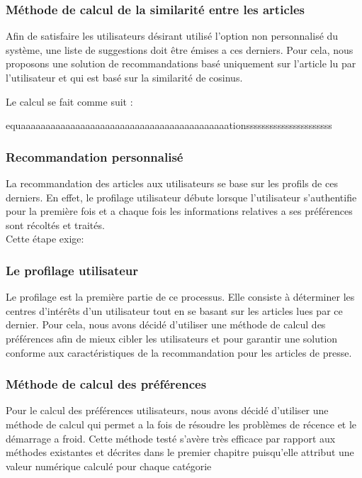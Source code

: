 \subsubsection{Méthode de calcul de la similarité entre les articles}
Afin de satisfaire les utilisateurs désirant utilisé l'option non personnalisé du système, une liste de suggestions doit être émises a ces derniers. Pour cela, nous proposons une solution de recommandations basé uniquement sur l'article lu par l'utilisateur et qui est basé sur la similarité de cosinus.

Le calcul se fait comme suit :

equaaaaaaaaaaaaaaaaaaaaaaaaaaaaaaaaaaaaaaaaaationssssssssssssssssssssss

\subsubsection{Recommandation personnalisé}
La recommandation des articles aux utilisateurs se base sur les profils de ces derniers. En effet, le profilage utilisateur débute lorsque l'utilisateur s'authentifie pour la première fois et a chaque fois les informations relatives a ses préférences sont récoltés et traités.\\
Cette étape exige:

\subsubsection{Le profilage utilisateur}
Le profilage est la première partie de ce processus. Elle consiste à déterminer les centres d’intérêts d’un utilisateur tout en se basant sur les articles lues par ce dernier. Pour cela, nous avons décidé d’utiliser une méthode de calcul des préférences afin de mieux cibler les utilisateurs et pour garantir une solution conforme aux caractéristiques de la recommandation pour les articles de presse.

\subsubsection{Méthode de calcul des préférences}
Pour le calcul des préférences utilisateurs, nous avons décidé d'utiliser une méthode de calcul qui permet a la fois de résoudre les problèmes de récence et le démarrage a froid. Cette méthode testé s'avère très efficace par rapport aux méthodes existantes et décrites dans le premier chapitre puisqu'elle attribut une valeur numérique calculé pour chaque catégorie

